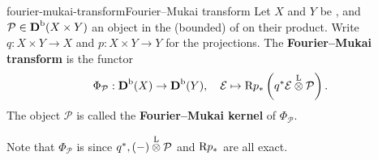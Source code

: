 \begin{topic}{fourier-mukai-transform}{Fourier--Mukai transform}
    Let $X$ and $Y$ be  , and $\mathcal{P} \in \textbf{D}^\textup{b}(X \times Y)$ an object in the (bounded)  of  on their product. Write $q : X \times Y \to X$ and $p : X \times Y \to Y$ for the projections. The \textbf{Fourier--Mukai transform} is the functor
    \[ \Phi_\mathcal{P} : \textbf{D}^\textup{b}(X) \to \textbf{D}^\textup{b}(Y), \quad \mathcal{E} \mapsto \textup{R} p_* \left( q^* \mathcal{E} \overset{\textup{L}}{\otimes} \mathcal{P} \right) . \]
    The object $\mathcal{P}$ is called the \textbf{Fourier--Mukai kernel} of $\Phi_\mathcal{P}$.
    
    Note that $\Phi_\mathcal{P}$ is  since $q^*, (-) \overset{\textup{L}}{\otimes} \mathcal{P}$ and $\textup{R} p_*$ are all exact.
\end{topic}

